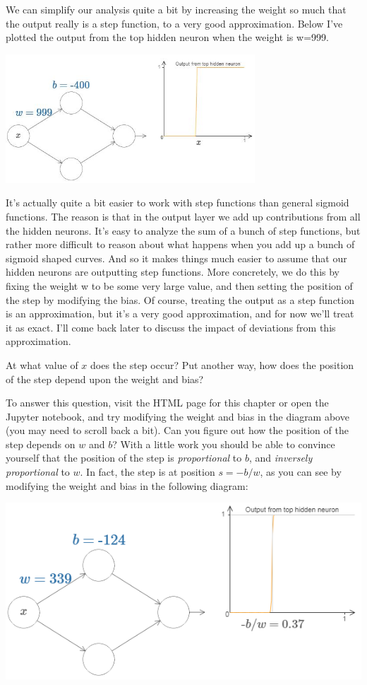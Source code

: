 We can simplify our analysis quite a bit by increasing the weight so much that the output really is a step function, to a very good approximation. Below I've plotted the output from the top hidden neuron when the weight is w=999. 

{\centering \includegraphics[width=0.7\textwidth,]{pic/high_weight_function.jpg} \par}

It's actually quite a bit easier to work with step functions than general sigmoid functions. The reason is that in the output layer we add up contributions from all the hidden neurons. It's easy to analyze the sum of a bunch of step functions, but rather more difficult to reason about what happens when you add up a bunch of sigmoid shaped curves. And so it makes things much easier to assume that our hidden neurons are outputting step functions. More concretely, we do this by fixing the weight w
to be some very large value, and then setting the position of the step by modifying the bias. Of course, treating the output as a step function is an approximation, but it's a very good approximation, and for now we'll treat it as exact. I'll come back later to discuss the impact of deviations from this approximation.

At what value of $x$ does the step occur? Put another way, how does the position of the step depend upon the weight and bias?

To answer this question, visit the HTML page for this chapter or open the Jupyter notebook, and try modifying the weight and bias in the diagram above (you may need to scroll back a bit). Can you figure out how the position of the step depends on $w$ and $b$? With a little work you should be able to convince yourself that the position of the step is \textit{proportional} to $b$, and \textit{inversely proportional} to $w$.
In fact, the step is at position $s=-b/w$, as you can see by modifying the weight and bias in the following diagram:

{\centering \includegraphics[width=\textwidth,]{pic/wigglyfn09.png} \par}



